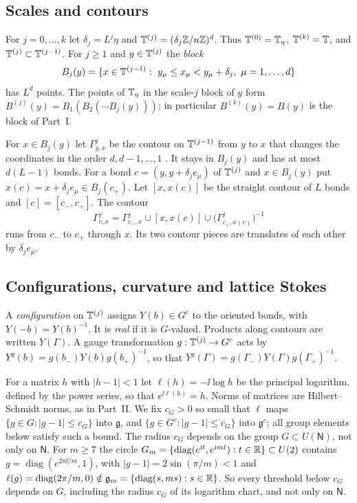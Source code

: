 \subsection{Scales and contours}

For $j=0,\dots,k$ let $\delta_j=L^j\eta$ and $\mathbb T^{(j)}=(\delta_j\mathbb Z/n\mathbb Z)^d$. Thus $\mathbb T^{(0)}=\mathbb T_\eta$, $\mathbb T^{(k)}=\mathbb T$, and $\mathbb T^{(j)}\subset\mathbb T^{(j-1)}$. For $j\ge1$ and $y\in\mathbb T^{(j)}$ the \emph{block}
\[
B_j(y)=\{x\in\mathbb T^{(j-1)}:\ y_\mu\le x_\mu<y_\mu+\delta_j,\ \mu=1,\dots,d\}
\]
has $L^d$ points. The points of $\mathbb T_\eta$ in the scale-$j$ block of $y$ form $B^{(j)}(y)=B_1(B_2(\cdots B_j(y)))$; in particular $B^{(k)}(y)=B(y)$ is the block of Part~I.

For $x\in B_j(y)$ let $\Gamma^j_{y,x}$ be the contour on $\mathbb T^{(j-1)}$ from $y$ to $x$ that changes the coordinates in the order $d,d-1,\dots,1$ \cite[(1.7)]{BalPropI}. It stays in $B_j(y)$ and has at most $d(L-1)$ bonds. For a bond $c=(y,y+\delta_je_\mu)$ of $\mathbb T^{(j)}$ and $x\in B_j(y)$ put $x(c)=x+\delta_je_\mu\in B_j(c_+)$. Let $[x,x(c)]$ be the straight contour of $L$ bonds and $[c]=[c_-,c_+]$. The contour
\[
\Gamma^j_{c,x}=\Gamma^j_{c_-,x}\cup[x,x(c)]\cup\big(\Gamma^j_{c_+,x(c)}\big)^{-1}
\]
runs from $c_-$ to $c_+$ through $x$. Its two contour pieces are translates of each other by $\delta_je_\mu$.

\subsection{Configurations, curvature and lattice Stokes}

A \emph{configuration} on $\mathbb T^{(j)}$ assigns $Y(b)\in G^c$ to the oriented bonds, with $Y(-b)=Y(b)^{-1}$. It is \emph{real} if it is $G$-valued. Products along contours are written $Y(\Gamma)$. A gauge transformation $g:\mathbb T^{(j)}\to G^c$ acts by $Y^g(b)=g(b_-)Y(b)g(b_+)^{-1}$, so that $Y^g(\Gamma)=g(\Gamma_-)Y(\Gamma)g(\Gamma_+)^{-1}$.

For a matrix $h$ with $|h-1|<1$ let $\ell(h)=-\ii\log h$ be the principal logarithm, defined by the power series, so that $e^{\ii\ell(h)}=h$. Norms of matrices are Hilbert--Schmidt norms, as in Part~II. We fix $c_G>0$ so small that $\ell$ maps $\{g\in G:|g-1|\le c_G\}$ into $\mathfrak g$, and $\{g\in G^c:|g-1|\le c_G\}$ into $\mathfrak g^c$; all group elements below satisfy such a bound. The radius $c_G$ depends on the group $G\subset U(\mathsf N)$, not only on $\mathsf N$. For $m\ge7$ the circle $G_m=\{\operatorname{diag}(e^{\mathrm i t},e^{\mathrm i mt}):t\in\mathbb R\}\subset U(2)$ contains $g=\operatorname{diag}(e^{2\pi\ii/m},1)$, with $|g-1|=2\sin(\pi/m)<1$ and $\ell(g)=\operatorname{diag}(2\pi/m,0)\notin\mathfrak g_m=\{\operatorname{diag}(s,ms):s\in\mathbb R\}$. So every threshold below $c_G$ depends on $G$, including the radius $c_G$ of its logarithm chart, and not only on $\mathsf N$.

